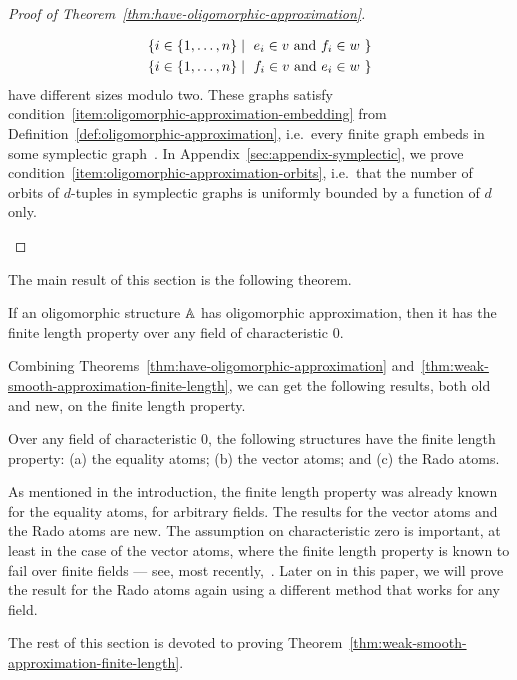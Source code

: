 \begin{proof}[Proof of Theorem~\ref{thm:have-oligomorphic-approximation}]
\begin{enumerate}
\begin{align*}
            \{ i \in \{1,\ldots,n\} \mid \text{ $e_i \in v$ and $f_i \in w$ }\}\\
            \{ i \in \{1,\ldots,n\} \mid \text{ $f_i \in v$ and $e_i \in w$ }\}
        \end{align*}
        have different sizes modulo two. 
        These graphs satisfy condition~\eqref{item:oligomorphic-approximation-embedding} from Definition~\ref{def:oligomorphic-approximation}, i.e.~every finite graph embeds in some symplectic graph~\cite[Thm.~8.11.2]{GR01}. 
        In Appendix~\ref{sec:appendix-symplectic}, we prove condition~\eqref{item:oligomorphic-approximation-orbits}, i.e.~that the number of orbits of $d$-tuples in symplectic graphs is uniformly bounded by a function of $d$ only. \qedhere
    \end{enumerate}
\end{proof}

The main result of this section is the following theorem.

\begin{theorem}\label{thm:weak-smooth-approximation-finite-length}
    If an oligomorphic structure $\mathbb{A}$ has oligomorphic approximation, then it has the finite length property over any field of characteristic $0$.
\end{theorem}

Combining Theorems~\ref{thm:have-oligomorphic-approximation} and~\ref{thm:weak-smooth-approximation-finite-length}, we can get the following results, both old and new, on the finite length property.

\begin{corollary}\label{cor:weak-finite-length}
    Over any field of characteristic $0$, the following structures have  the finite length property: (a) the equality atoms; (b) the vector atoms; and (c) the Rado atoms.
\end{corollary}

As mentioned in the introduction, the finite length property was already known for the equality atoms, for arbitrary fields. The results for the vector atoms and the Rado atoms are new. The assumption on characteristic zero is important, at least in the case of the vector atoms, where  the finite length property is known to fail over finite fields --- see, most recently,~\cite[Sec.~4.4]{BFKM24}. Later on in this paper, we will prove the result for the Rado atoms again using a different method that works for any field.

The rest of this section is devoted to proving Theorem~\ref{thm:weak-smooth-approximation-finite-length}.

